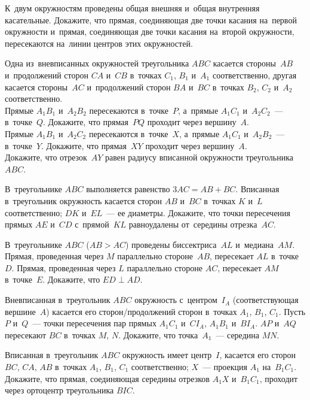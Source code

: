 


\begin{problems}

\item
К~двум окружностям проведены общая внешняя и~общая внутренняя касательные.
Докажите, что прямая, соединяющая две точки касания на~первой окружности
и~прямая, соединяющая две точки касания на~второй окружности, пересекаются
на~линии центров этих окружностей.

\item
Одна из~вневписанных окружностей треугольника $ABC$ касается стороны~$AB$
и~продолжений сторон $CA$ и~$CB$ в~точках $C_{1}$, $B_{1}$ и~$A_{1}$
соответственно, другая касается стороны~$AC$ и~продолжений сторон $BA$ и~$BC$
в~точках $B_{2}$, $C_{2}$ и~$A_{2}$ соответственно.
\\
\subproblem
Прямые $A_{1}B_{1}$ и~$A_{2}B_{2}$ пересекаются в~точке~$P$,
а~прямые $A_{1}C_{1}$ и~$A_{2}C_{2}$~--- в~точке~$Q$.
Докажите, что прямая~$PQ$ проходит через вершину~$A$.
\\
\subproblem
Прямые $A_{1}B_{1}$ и~$A_{2}C_{2}$ пересекаются в~точке~$X$,
а~прямые $A_{1}C_{1}$ и~$A_{2}B_{2}$~--- в~точке~$Y$.
Докажите, что прямая~$XY$ проходит через вершину~$A$.
\\
\subproblem
Докажите, что отрезок~$AY$ равен радиусу вписанной окружности
треугольника $ABC$.

\item
В~треугольнике $ABC$ выполняется равенство $3 AC = AB + BC$.
Вписанная в~треугольник окружность касается сторон $AB$ и~$BC$
в~точках $K$ и~$L$ соответственно;
$DK$ и~$EL$~--- ее диаметры.
Докажите, что точки пересечения прямых $AE$ и~$CD$ с~прямой~$KL$ равноудалены
от~середины отрезка~$AC$.

\item
В~треугольнике $ABC$ ($AB > AC$) проведены биссектриса~$AL$ и~медиана~$AM$.
Прямая, проведенная через $M$ параллельно стороне~$AB$, пересекает $AL$
в~точке~$D$.
Прямая, проведенная через $L$ параллельно стороне $AC$, пересекает $AM$
в~точке~$E$.
Докажите, что $ED \perp AD$.

\item
Вневписанная в~треугольник $ABC$ окружность с~центром~$I_{A}$
(соответствующая вершине~$A$) касается его сторон/продолжений сторон
в~точках $A_{1}$, $B_{1}$, $C_{1}$.
Пусть $P$ и~$Q$~--- точки пересечения пар прямых
$A_{1}C_{1}$ и~$CI_{A}$, $A_{1}B_{1}$ и~$BI_{A}$.
$AP$ и~$AQ$ пересекают $BC$ в~точках $M$, $N$.
Докажите, что точка~$A_{1}$~--- середина $MN$.

\item
Вписанная в~треугольник $ABC$ окружность имеет центр~$I$, касается его
сторон $BC$, $CA$, $AB$ в~точках $A_{1}$, $B_{1}$, $C_{1}$ соответственно;
$X$~--- проекция $A_{1}$ на~$B_{1}C_{1}$.
Докажите, что прямая, соединяющая середины отрезков $A_{1}X$ и~$B_{1}C_{1}$,
проходит через ортоцентр треугольника $BIC$.

\end{problems}

